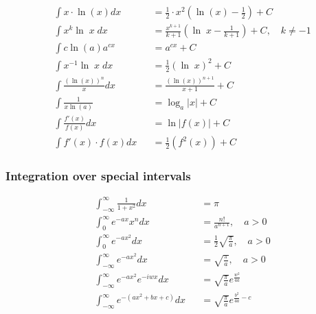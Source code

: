 \begin{footnotesize}
\begin{align*}
         & \int x \cdot \ln(x) dx                &  & =\frac 1 2 \cdot x^2(\ln(x)-\frac{1}{2})+C                                        \\
         & \int x^k \ln\; x \;dx                 &  & =\frac{x^{k+1}}{k+1}\left(\ln\; x-\frac{1}{k+1}\right)+C,\quad k\neq -1           \\
         & \int c\ln(a)a^{cx}                    &  & = a^{cx} + C                                                                      \\
         & \int x^{-1}\ln\; x \; dx              &  & =\frac{1}{2}{(\ln\; x)}^2+C                                                       \\
         & \int \frac{{(\ln(x))}^n}{x}dx         &  & =\frac{{(\ln(x))}^{n+1}}{x+1}+C                                                   \\
         & \int \frac{1}{x\ln(a)}                &  & = \log_a|x| +C                                                                    \\
         & \int \frac{f'(x)}{f(x)}dx             &  & =\ln\vert f(x) \vert +C                                                           \\
         & \int f'(x) \cdot f(x) dx              &  & = \frac{1}{2}(f^2(x))+C
    \end{align*}
\end{footnotesize}

\subsubsection{Integration over special intervals}
\noindent
\begin{align*}
     & \int_{-\infty}^{\infty}\frac{1}{1+x^2}dx    &  & = \pi                                      \\
     & \int_0^{\infty} e^{-ax}x^n dx               &  & =\frac{n!}{a^{n+1}},\quad a>0              \\
     & \int_0^{\infty} e^{-ax^2} dx                &  & =\frac{1}{2}\sqrt{\frac{\pi}{a}},\quad a>0 \\
     & \int_{-\infty}^{\infty} e^{-ax^2} dx        &  & =\sqrt{\frac{\pi}{a}},\quad a>0            \\
     & \int_{-\infty}^{\infty}e^{-ax^2}e^{-iwx} dx &  & = \sqrt{\frac{\pi}{a}}e^{\frac{w^2}{4a}}   \\
     & \int_{-\infty}^{\infty}e^{-(ax^2+bx+c)}dx   &  & = \sqrt{\frac{\pi}{a}}e^{\frac{b^2}{4a}-c} \\
\end{align*}

